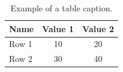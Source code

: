 \begin{table}[h]
\centering
\caption{Example of a table caption.}
\label{tab:example}
\begin{tabular}{lcc}
\hline
Name & Value 1 & Value 2 \\
\hline
Row 1 & 10 & 20 \\
Row 2 & 30 & 40 \\
\hline
\end{tabular}
\end{table}
